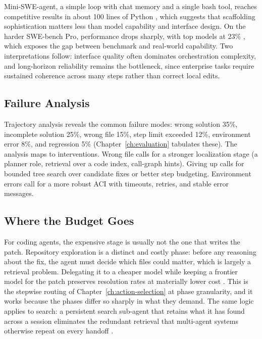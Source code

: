 \documentclass[11pt]{book}
\begin{document}
Mini-SWE-agent, a simple loop with chat memory and a single bash tool, reaches competitive results in about 100 lines of Python \cite{springaibench2025}, which suggests that scaffolding sophistication matters less than model capability and interface design. On the harder SWE-bench Pro, performance drops sharply, with top models at 23\% \cite{swebenchpro2025}, which exposes the gap between benchmark and real-world capability. Two interpretations follow: interface quality often dominates orchestration complexity, and long-horizon reliability remains the bottleneck, since enterprise tasks require sustained coherence across many steps rather than correct local edits.

\subsection{Failure Analysis}

Trajectory analysis reveals the common failure modes: wrong solution 35\%, incomplete solution 25\%, wrong file 15\%, step limit exceeded 12\%, environment error 8\%, and regression 5\% (Chapter~\ref{ch:evaluation} tabulates these). The analysis maps to interventions. Wrong file calls for a stronger localization stage (a planner role, retrieval over a code index, call-graph hints). Giving up calls for bounded tree search over candidate fixes or better step budgeting. Environment errors call for a more robust ACI with timeouts, retries, and stable error messages.

\subsection{Where the Budget Goes}

For coding agents, the expensive stage is usually not the one that writes the patch. Repository exploration is a distinct and costly phase: before any reasoning about the fix, the agent must decide which files could matter, which is largely a retrieval problem. Delegating it to a cheaper model while keeping a frontier model for the patch preserves resolution rates at materially lower cost \cite{repoexplore2026}. This is the stepwise routing of Chapter~\ref{ch:action-selection} at phase granularity, and it works because the phases differ so sharply in what they demand. The same logic applies to search: a persistent search sub-agent that retains what it has found across a session eliminates the redundant retrieval that multi-agent systems otherwise repeat on every handoff \cite{librarian2026}.
\end{document}
